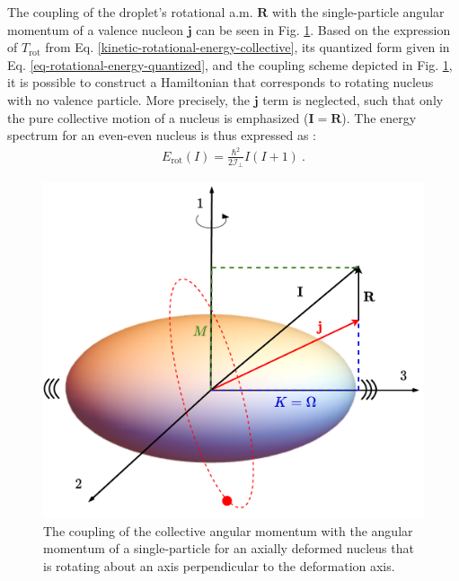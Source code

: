 The coupling of the droplet's rotational a.m. $\mathbf{R}$ with the single-particle angular momentum of a valence nucleon $\mathbf{j}$ can be seen in Fig. \ref{rotational-coupling-schematic}. Based on the expression of $T_\text{rot}$ from Eq. \eqref{kinetic-rotational-energy-collective}, its quantized form given in Eq. \eqref{eq-rotational-energy-quantized}, and the coupling scheme depicted in Fig. \ref{rotational-coupling-schematic}, it is possible to construct a Hamiltonian that corresponds to rotating nucleus with no valence particle. More precisely, the $\mathbf{j}$ term is neglected, such that only the pure collective motion of a nucleus is emphasized ($\mathbf{I}=\mathbf{R}$). The energy spectrum for an even-even nucleus is thus expressed as \cite{davydov1958rotational}:
\begin{align}
    E_\text{rot}(I)=\frac{\hbar^2}{2\mathcal{I}_\perp}I(I+1)\ .
    \label{eq-simple-rotor-spectrum}
\end{align}
\begin{figure}
    \centering
    \includegraphics[scale=0.6]{Chapters/Figures/SCHEMATIC_COUPLING_ROTATIONAL.pdf}
    \caption{The coupling of the collective angular momentum with the angular momentum of a single-particle for an axially deformed nucleus that is rotating about an axis perpendicular to the deformation axis.}
    \label{rotational-coupling-schematic}
\end{figure}

